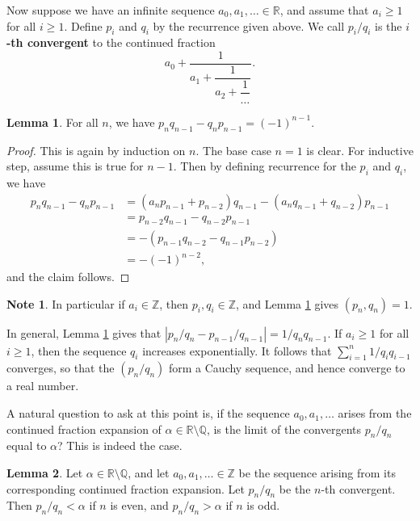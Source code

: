 \documentclass{article}
\newcommand{\Z}{\mathbb{Z}}
\newcommand{\Q}{\mathbb{Q}}
\newcommand{\R}{\mathbb{R}}
\newcommand{\rb}[1]{\left( #1 \right)}
\newcommand{\abs}[1]{\left\lvert #1 \right\rvert}
\theoremstyle{definition}\newtheorem{definition}{Definition}
\theoremstyle{definition}\newtheorem{remark}[definition]{Remark}
\theoremstyle{definition}\newtheorem*{example}{Example}
\theoremstyle{definition}\newtheorem*{note}{Note}
\newtheorem{lemma}[definition]{Lemma}
\begin{document}
Now suppose we have an infinite sequence $ a_0, a_1, \dots \in \R $, and assume that $ a_i \ge 1 $ for all $ i \ge 1 $. Define $ p_i $ and $ q_i $ by the recurrence given above. We call $ p_i / q_i $ is the \textbf{$ i $-th convergent} to the continued fraction
$$ a_0 + \dfrac{1}{a_1 + \dfrac{1}{a_2 + \dfrac{1}{\dots}}}. $$

\begin{lemma}
\label{lem:69}
For all $ n $, we have $ p_nq_{n - 1} - q_np_{n - 1} = \rb{-1}^{n - 1} $.
\end{lemma}

\begin{proof}
This is again by induction on $ n $. The base case $ n = 1 $ is clear. For inductive step, assume this is true for $ n - 1 $. Then by defining recurrence for the $ p_i $ and $ q_i $, we have
\begin{align*}
p_nq_{n - 1} - q_np_{n - 1}
& = \rb{a_np_{n - 1} + p_{n - 2}}q_{n - 1} - \rb{a_nq_{n - 1} + q_{n - 2}}p_{n - 1} \\
& = p_{n - 2}q_{n - 1} - q_{n - 2}p_{n - 1} \\
& = -\rb{p_{n - 1}q_{n - 2} - q_{n - 1}p_{n - 2}} \\
& = -\rb{-1}^{n - 2},
\end{align*}
and the claim follows.
\end{proof}

\begin{note}
In particular if $ a_i \in \Z $, then $ p_i, q_i \in \Z $, and Lemma \ref{lem:69} gives $ \rb{p_n, q_n} = 1 $.
\end{note}

In general, Lemma \ref{lem:69} gives that $ \abs{p_n / q_n - p_{n - 1} / q_{n - 1}} = 1 / q_nq_{n - 1} $. If $ a_i \ge 1 $ for all $ i \ge 1 $, then the sequence $ q_i $ increases exponentially. It follows that $ \sum_{i = 1}^n 1 / q_iq_{i - 1} $ converges, so that the $ \rb{p_n / q_n} $ form a Cauchy sequence, and hence converge to a real number.


A natural question to ask at this point is, if the sequence $ a_0, a_1, \dots $ arises from the continued fraction expansion of $ \alpha \in \R \setminus \Q $, is the limit of the convergents $ p_n / q_n $ equal to $ \alpha $? This is indeed the case.

\begin{lemma}
\label{lem:70}
Let $ \alpha \in \R \setminus \Q $, and let $ a_0, a_1, \dots \in \Z $ be the sequence arising from its corresponding continued fraction expansion. Let $ p_n / q_n $ be the $ n $-th convergent. Then $ p_n / q_n < \alpha $ if $ n $ is even, and $ p_n / q_n > \alpha $ if $ n $ is odd.
\end{lemma}
\end{document}
